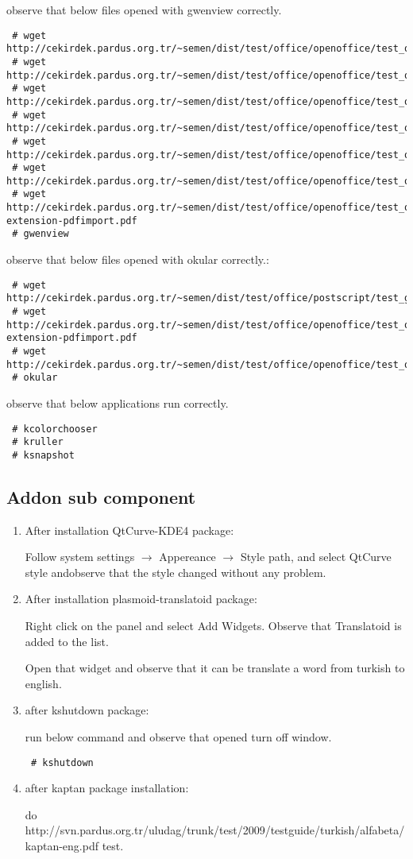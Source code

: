 \documentclass[a4paper,10pt]{article}
\begin{document}
\begin{enumerate}
observe that below files opened with gwenview correctly.
\begin{verbatim} 
 # wget http://cekirdek.pardus.org.tr/~semen/dist/test/office/openoffice/test_oodraw.jpg
 # wget http://cekirdek.pardus.org.tr/~semen/dist/test/office/openoffice/test_oodraw.mng
 # wget http://cekirdek.pardus.org.tr/~semen/dist/test/office/openoffice/test_oodraw.png
 # wget http://cekirdek.pardus.org.tr/~semen/dist/test/office/openoffice/test_oodraw.ps
 # wget http://cekirdek.pardus.org.tr/~semen/dist/test/office/openoffice/test_oodraw.tif
 # wget http://cekirdek.pardus.org.tr/~semen/dist/test/office/openoffice/test_oodraw.xcf
 # wget http://cekirdek.pardus.org.tr/~semen/dist/test/office/openoffice/test_openoffice-extension-pdfimport.pdf
 # gwenview
\end{verbatim}
observe that below files opened with okular correctly.:
\begin{verbatim} 
 # wget http://cekirdek.pardus.org.tr/~semen/dist/test/office/postscript/test_ghostscript.dvi
 # wget http://cekirdek.pardus.org.tr/~semen/dist/test/office/openoffice/test_openoffice-extension-pdfimport.pdf
 # wget http://cekirdek.pardus.org.tr/~semen/dist/test/office/openoffice/test_oodraw.ps
 # okular
 \end{verbatim}

observe that below applications run correctly.
\begin{verbatim}
 # kcolorchooser
 # kruller
 # ksnapshot
\end{verbatim}


\end{enumerate}

\subsection*{Addon sub component}
\begin{enumerate}
\item After installation QtCurve-KDE4 package:

Follow system settings $\rightarrow$ Appereance $\rightarrow$ Style path, and select QtCurve style andobserve that the style changed without any problem.

 \item After installation plasmoid-translatoid package:

Right click on the panel and select Add Widgets. Observe that Translatoid is added to the list.

Open that widget and observe that it can be translate a word from turkish to english.

 \item after kshutdown package:

run below command and observe that opened turn off window.
\begin{verbatim}
 # kshutdown 
\end{verbatim}

 \item after kaptan package installation:

  do http://svn.pardus.org.tr/uludag/trunk/test/2009/testguide/turkish/alfabeta/kaptan-eng.pdf test.

\end{enumerate}
\end{document}
